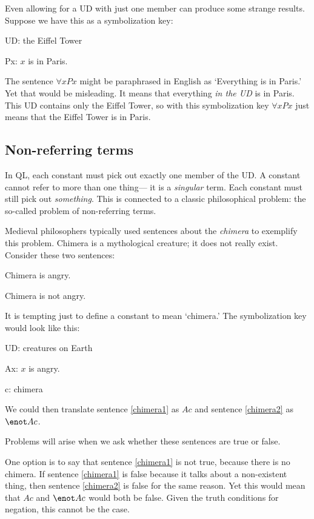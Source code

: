 Even allowing for a UD with just one member can produce some strange results. Suppose we have this as a symbolization key:
\begin{ekey}
\item[UD:] the Eiffel Tower
\item[Px:] $x$ is in Paris.
\end{ekey}
The sentence $\forall x Px$ might be paraphrased in English as `Everything is in Paris.' Yet that would be misleading. It means that everything \emph{in the UD} is in Paris. This UD contains only the Eiffel Tower, so with this symbolization key $\forall x Px$ just means that the Eiffel Tower is in Paris.



\subsection{Non-referring terms}
In QL, each constant must pick out exactly one member of the UD. A constant cannot refer to more than one thing--- it is a \emph{singular} term. Each constant must still pick out \emph{something}. This is connected to a classic philosophical problem: the so-called problem of non-referring terms.

Medieval philosophers typically used sentences about the \emph{chimera} to exemplify this problem. Chimera is a mythological creature; it does not really exist. Consider these two sentences:
\begin{earg}
\item[\ex{chimera1}] Chimera is angry.
\item[\ex{chimera2}] Chimera is not angry.
\end{earg}
It is tempting just to define a constant to mean `chimera.' The symbolization key would look like this:
\begin{ekey}
\item[UD:] creatures on Earth
\item[Ax:] $x$ is angry.
\item[c:] chimera
\end{ekey}
We could then translate sentence \ref{chimera1} as $Ac$ and sentence \ref{chimera2} as $\enot Ac$.

Problems will arise when we ask whether these sentences are true or false.

One option is to say that sentence \ref{chimera1} is not true, because there is no chimera. If sentence \ref{chimera1} is false because it talks about a non-existent thing, then sentence \ref{chimera2} is false for the same reason. Yet this would mean that $Ac$ and $\enot Ac$ would both be false. Given the truth conditions for negation, this cannot be the case.

